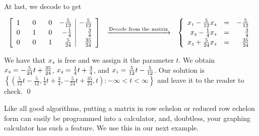 \begin{ex}
\[\begin{array}{ccc}
 \end{array}\]
 
 At last, we decode to get
 
 \[ \begin{array}{ccc}

 \left[ \begin{array}{rrrr|r}
 1 & \hphantom{-}0 & \hphantom{-}0 & -\frac{5}{12} & -\frac{5}{12} \\ [2pt]
 0 & 1 & 0 & -\frac{1}{4} & \frac{3}{4} \\ [2pt]
 0 & 0& 1 & \frac{5}{24} & \frac{35}{24} \\  \end{array} \right] 
 
& 
\xrightarrow{\text{Decode from the matrix}} 
& 
\left\{ \begin{array}{rcr} 
x_{\mbox{\tiny$1$}} - \frac{5}{12} x_{\mbox{\tiny$4$}} & = & -\frac{5}{12} \\ [2pt]
x_{\mbox{\tiny$2$}} - \frac{1}{4}x_{\mbox{\tiny$4$}} & = & \frac{3}{4} \\ [2pt]
x_{\mbox{\tiny$3$}} + \frac{5}{24} x_{\mbox{\tiny$4$}} & = & \frac{35}{24} \end{array} \right.

\end{array}\]

We have that $x_{\mbox{\tiny$4$}}$ is free and we assign it the parameter $t$.  We obtain $x_{\mbox{\tiny$3$}} = -\frac{5}{24} t + \frac{35}{24}$, $x_{\mbox{\tiny$2$}} = \frac{1}{4} t + \frac{3}{4}$, and $x_{\mbox{\tiny$1$}} = \frac{5}{12}t - \frac{5}{12}$.  Our solution is $\left\{ \left( \frac{5}{12}t - \frac{5}{12}, \frac{1}{4} t + \frac{3}{4}, -\frac{5}{24} t + \frac{35}{24}, t \right) : -\infty < t < \infty \right\}$ and leave it to the reader to check. \qed

\end{ex}

Like all good algorithms, putting a matrix in row echelon or reduced row echelon form can easily be programmed into a calculator, and, doubtless, your graphing calculator has such a feature.  We use this in our next example.

